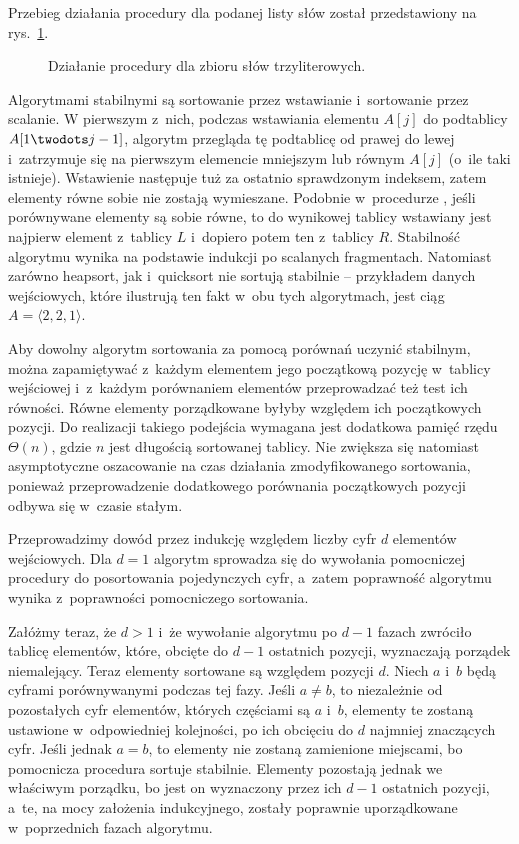 
\exercise %
Przebieg działania procedury  dla podanej listy słów został przedstawiony na rys.\ \ref{fig:8.3-1}.
\begin{figure}[!ht]
	\centering 
	\caption{Działanie procedury  dla zbioru słów trzyliterowych.} \label{fig:8.3-1}
\end{figure}

\exercise %
Algorytmami stabilnymi są sortowanie przez wstawianie i~sortowanie przez scalanie.
W pierwszym z~nich, podczas wstawiania elementu $A[j]$ do podtablicy $A[1\twodots j-1]$, algorytm przegląda tę podtablicę od prawej do lewej i~zatrzymuje się na pierwszym elemencie mniejszym lub równym $A[j]$ (o~ile taki istnieje).
Wstawienie następuje tuż za ostatnio sprawdzonym indeksem, zatem elementy równe sobie nie zostają wymieszane.
Podobnie w~procedurze , jeśli porównywane elementy są sobie równe, to do wynikowej tablicy wstawiany jest najpierw element z~tablicy $L$ i~dopiero potem ten z~tablicy $R$.
Stabilność algorytmu wynika na podstawie indukcji po scalanych fragmentach.
Natomiast zarówno heapsort, jak i~quicksort nie sortują stabilnie -- przykładem danych wejściowych, które ilustrują ten fakt w~obu tych algorytmach, jest ciąg $A=\langle2,2,1\rangle$.

Aby dowolny algorytm sortowania za pomocą porównań uczynić stabilnym, można zapamiętywać z~każdym elementem jego początkową pozycję w~tablicy wejściowej i~z~każdym porównaniem elementów przeprowadzać też test ich równości.
Równe elementy porządkowane byłyby względem ich początkowych pozycji.
Do realizacji takiego podejścia wymagana jest dodatkowa pamięć rzędu $\Theta(n)$, gdzie $n$ jest długością sortowanej tablicy.
Nie zwiększa się natomiast asymptotyczne oszacowanie na czas działania zmodyfikowanego sortowania, ponieważ przeprowadzenie dodatkowego porównania początkowych pozycji odbywa się w~czasie stałym.

\exercise %
Przeprowadzimy dowód przez indukcję względem liczby cyfr $d$ elementów wejściowych.
Dla $d=1$ algorytm  sprowadza się do wywołania pomocniczej procedury do posortowania pojedynczych cyfr, a~zatem poprawność algorytmu wynika z~poprawności pomocniczego sortowania.

Załóżmy teraz, że $d>1$ i~że wywołanie algorytmu  po $d-1$ fazach zwróciło tablicę elementów, które, obcięte do $d-1$ ostatnich pozycji, wyznaczają porządek niemalejący.
Teraz elementy sortowane są względem pozycji $d$.
Niech $a$ i~$b$ będą cyframi porównywanymi podczas tej fazy.
Jeśli $a\ne b$, to niezależnie od pozostałych cyfr elementów, których częściami są $a$ i~$b$, elementy te zostaną ustawione w~odpowiedniej kolejności, po ich obcięciu do $d$ najmniej znaczących cyfr.
Jeśli jednak $a=b$, to elementy nie zostaną zamienione miejscami, bo pomocnicza procedura sortuje stabilnie.
Elementy pozostają jednak we właściwym porządku, bo jest on wyznaczony przez ich $d-1$ ostatnich pozycji, a~te, na mocy założenia indukcyjnego, zostały poprawnie uporządkowane w~poprzednich fazach algorytmu.

